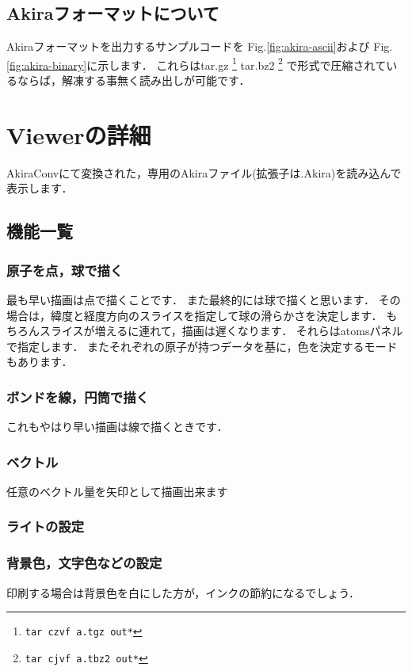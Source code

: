 \documentclass[a4j,openany]{jbook}
\begin{document}
 \section{Akiraフォーマットについて}\label{sec:Akira-format}
 Akiraフォーマットを出力するサンプルコードを
  Fig.\ref{fig:akira-ascii}および
  Fig.\ref{fig:akira-binary}に示します．
  これらはtar.gz
  \footnote{\tt tar czvf a.tgz out*}
  tar.bz2
  \footnote{\tt tar cjvf a.tbz2 out*}
  で形式で圧縮されているならば，解凍する事無く読み出しが可能です．

\chapter{Viewerの詳細}
AkiraConvにて変換された，専用のAkiraファイル(拡張子は.Akira)を読み込んで表示します．

 \section{機能一覧}
  \subsection*{原子を点，球で描く}
   最も早い描画は点で描くことです．
   また最終的には球で描くと思います．
   その場合は，緯度と経度方向のスライスを指定して球の滑らかさを決定します．
   もちろんスライスが増えるに連れて，描画は遅くなります．
   それらはatomsパネルで指定します．
   またそれぞれの原子が持つデータを基に，色を決定するモードもあります．

  \subsection*{ボンドを線，円筒で描く}
   これもやはり早い描画は線で描くときです．

  \subsection*{ベクトル}
   任意のベクトル量を矢印として描画出来ます

  \subsection*{ライトの設定}

  \subsection*{背景色，文字色などの設定}
   印刷する場合は背景色を白にした方が，インクの節約になるでしょう．
\end{document}

